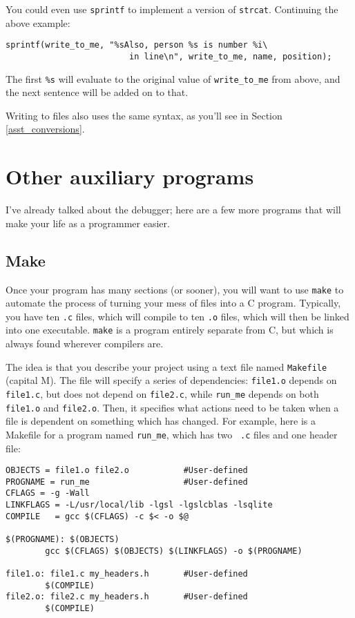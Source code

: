 \documentclass[12pt]{article}
\begin{document}
You could even use {\tt sprintf} to implement a version of {\tt strcat}. Continuing the above example:
\begin{verbatim}
sprintf(write_to_me, "%sAlso, person %s is number %i\
                         in line\n", write_to_me, name, position);
\end{verbatim}
The first {\tt \%s} will evaluate to the original value of {\tt write\_to\_me} from above, and the next
sentence will be added on to that.

Writing to files also uses the same syntax, as you'll see in Section \ref{asst_conversions}.

\section{Other auxiliary programs} I've already talked about the debugger; here
are a few more programs that will make your life as a programmer easier.

\subsection{Make} \label{make} 
Once your program has many sections (or sooner), you will want to use
{\tt make} to automate the process of turning your mess of files into
a C program. Typically, you have ten {\tt .c} files, which will compile
to ten {\tt .o} files, which will then be linked into one executable.
 {\tt make} is a program entirely separate from C, but which
is always found wherever compilers are.

The idea is that you describe your project using a
text file named {\tt Makefile} (capital M). The file will specify a
series of dependencies: {\tt file1.o} depends on {\tt file1.c}, but does
not depend on {\tt file2.c}, while {\tt run\_me} depends on both {\tt
file1.o} and {\tt file2.o}.  Then, it specifies what actions need to be taken
when a file is dependent on something which has changed.  For example,
here is a Makefile for a program named {\tt run\_me}, which has two {\tt
.c} files and one header file:

\begin{verbatim}
OBJECTS = file1.o file2.o           #User-defined
PROGNAME = run_me                   #User-defined
CFLAGS = -g -Wall
LINKFLAGS = -L/usr/local/lib -lgsl -lgslcblas -lsqlite
COMPILE   = gcc $(CFLAGS) -c $< -o $@

$(PROGNAME): $(OBJECTS)
        gcc $(CFLAGS) $(OBJECTS) $(LINKFLAGS) -o $(PROGNAME)

file1.o: file1.c my_headers.h       #User-defined
        $(COMPILE)
file2.o: file2.c my_headers.h       #User-defined
        $(COMPILE)
\end{verbatim}
\end{document}
